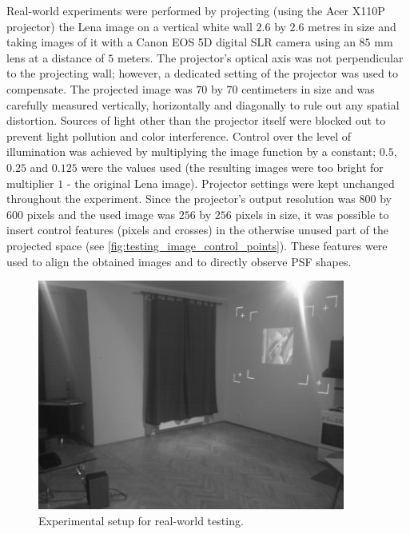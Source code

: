 \documentclass[12pt,notitlepage]{report}
\begin{document}
Real-world experiments were performed by projecting (using the Acer X110P projector) the Lena image on a vertical white wall $2.6$ by $2.6$ metres in size and taking images of it with a Canon EOS 5D digital SLR camera using an $85$ mm lens at a distance of $5$ meters. The projector's optical axis was not perpendicular to the projecting wall; however, a dedicated setting of the projector was used to compensate. The projected image was $70$ by $70$ centimeters in size and was carefully measured vertically, horizontally and diagonally to rule out any spatial distortion.  Sources of light other than the projector itself were blocked out to prevent light pollution and color interference. Control over the level of illumination was achieved by multiplying the image function by a constant; $0.5$, $0.25$ and $0.125$ were the values used (the resulting images were too bright for multiplier $1$ - the original Lena image). Projector settings were kept unchanged throughout the experiment. Since the projector's output resolution was $800$ by $600$ pixels and the used image was $256$ by $256$ pixels in size, it was possible to insert control features (pixels and crosses) in the otherwise unused part of the projected space (see \ref{fig:testing_image_control_points}). These features were used to align the obtained images and to directly observe PSF shapes. 
\begin{figure}[h]
 \centering
  \includegraphics[width=0.9\textwidth]{testing_setup.png}
 \caption[Experimental setup for real-world testing]{Experimental setup for real-world testing.}
 \label{fig:testing_setup}
\end{figure}
\end{document}
